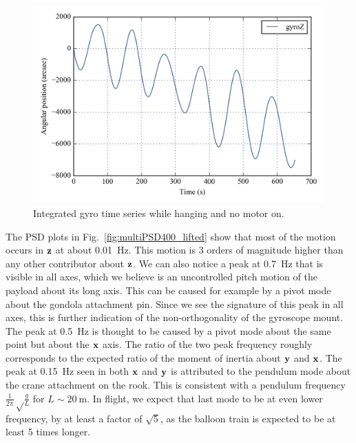 \begin{figure}[!ht]
\begin{center}
\includegraphics{Figures/integral_lifted_gyroZ.png}
\vspace{-0.5cm}
\caption[Integrated gyro time series while hanging]{Integrated gyro time series while hanging and no motor on.}
\label{fig:intgralgyroZ400}
\end{center}
\end{figure}

The PSD plots in Fig.~\ref{fig:multiPSD400_lifted} show that most of the motion occurs in $\textrm{\textbf{z}}$ at about \SI{0.01}{\hertz}. This motion is 3 orders of magnitude higher than any other contributor about $\textrm{\textbf{z}}$. We can also notice a peak at \SI{0.7}{\hertz} that is visible in all axes, which we believe is an uncontrolled pitch motion of the payload about its long axis. This can be caused for example by a pivot mode about the gondola attachment pin. Since we see the signature of this peak in all axes, this is further indication of the non-orthogonality of the gyroscope mount. The peak at \SI{0.5}{\hertz} is thought to be caused by a pivot mode about the same point but about the $\textrm{\textbf{x}}$ axis. The ratio of the two peak frequency roughly corresponds to the expected ratio of the moment of inertia about $\textrm{\textbf{y}}$ and $\textrm{\textbf{x}}$. The peak at \SI{0.15}{\hertz} seen in both $\textrm{\textbf{x}}$ and $\textrm{\textbf{y}}$ is attributed to the pendulum mode about the crane attachment on the rook. This is consistent with a pendulum frequency $\frac{1}{2\pi}\sqrt\frac{g}{L}$ for $L\sim\SI{20}{\meter}$. In flight, we expect that last mode to be at even lower frequency, by at least a factor of $\sqrt{5}$, as the balloon train is expected to be at least 5 times longer.

